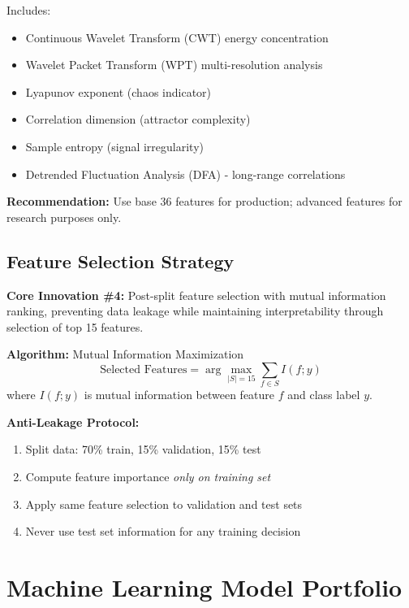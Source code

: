\documentclass[11pt,a4paper]{article}
\begin{document}
Includes:
\begin{itemize}[itemsep=0.2em]
    \item Continuous Wavelet Transform (CWT) energy concentration
    \item Wavelet Packet Transform (WPT) multi-resolution analysis
    \item Lyapunov exponent (chaos indicator)
    \item Correlation dimension (attractor complexity)
    \item Sample entropy (signal irregularity)
    \item Detrended Fluctuation Analysis (DFA) - long-range correlations
\end{itemize}

\textbf{Recommendation:} Use base 36 features for production; advanced features for research purposes only.

\subsection{Feature Selection Strategy}

\begin{innovation}
\textbf{Core Innovation \#4:} Post-split feature selection with mutual information ranking, preventing data leakage while maintaining interpretability through selection of top 15 features.
\end{innovation}

\textbf{Algorithm:} Mutual Information Maximization
\begin{equation}
\text{Selected Features} = \arg\max_{|S|=15} \sum_{f \in S} I(f; y)
\end{equation}
where $I(f; y)$ is mutual information between feature $f$ and class label $y$.

\textbf{Anti-Leakage Protocol:}
\begin{enumerate}[itemsep=0.2em]
    \item Split data: 70\% train, 15\% validation, 15\% test
    \item Compute feature importance \textit{only on training set}
    \item Apply same feature selection to validation and test sets
    \item Never use test set information for any training decision
\end{enumerate}

\section{Machine Learning Model Portfolio}
\end{document}
